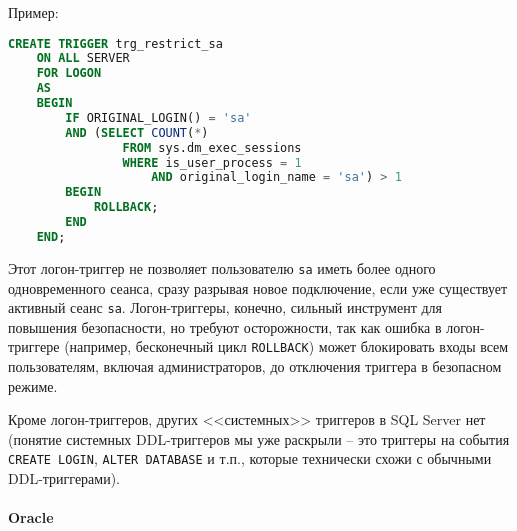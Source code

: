  Пример:
 \begin{lstlisting}[language=SQL]
    CREATE TRIGGER trg_restrict_sa
    ON ALL SERVER
    FOR LOGON
    AS
    BEGIN
        IF ORIGINAL_LOGIN() = 'sa'
        AND (SELECT COUNT(*) 
                FROM sys.dm_exec_sessions
                WHERE is_user_process = 1
                    AND original_login_name = 'sa') > 1
        BEGIN
            ROLLBACK;
        END
    END;
\end{lstlisting}

 Этот логон-триггер не позволяет пользователю \texttt{sa} иметь более одного одновременного сеанса, сразу разрывая новое подключение, если уже существует активный сеанс \texttt{sa}. Логон-триггеры, конечно, сильный инструмент для повышения безопасности, но требуют осторожности, так как ошибка в логон-триггере (например, бесконечный цикл \texttt{ROLLBACK}) может блокировать входы всем пользователям, включая администраторов, до отключения триггера в безопасном режиме. 
 
 Кроме логон-триггеров, других <<системных>> триггеров в SQL Server нет (понятие системных DDL-триггеров мы уже раскрыли – это триггеры на события \texttt{CREATE LOGIN}, \texttt{ALTER DATABASE} и т.п., которые технически схожи с обычными DDL-триггерами).

\paragraph{\textbf{Oracle}} ~\\

